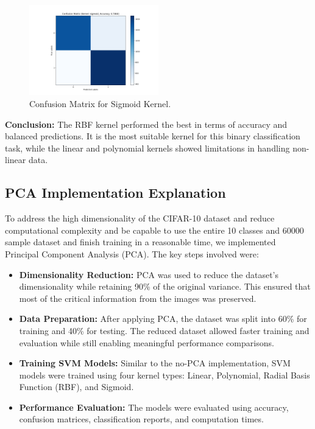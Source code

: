 \documentclass[lettersize,journal]{IEEEtran}
\begin{document}
\begin{figure}[H]
    \centering
    \includegraphics[width=0.5\textwidth]{confusion_matrix_2_classes_sigmoid.png}
    \caption{Confusion Matrix for Sigmoid Kernel.}
    \label{fig:confusion-matrix-sigmoid}
\end{figure}

\clearpage
\textbf{Conclusion:} The RBF kernel performed the best in terms of accuracy and balanced predictions. It is the most suitable kernel for this binary classification task, while the linear and polynomial kernels showed limitations in handling non-linear data.

\subsection{\textbf{PCA Implementation Explanation}}
To address the high dimensionality of the CIFAR-10 dataset and reduce computational complexity and be capable to use the entire 10 classes and 60000 sample dataset and finish training in a reasonable time, we implemented Principal Component Analysis (PCA). The key steps involved were:

\begin{itemize}
    \item \textbf{Dimensionality Reduction:} PCA was used to reduce the dataset's dimensionality while retaining 90\% of the original variance. This ensured that most of the critical information from the images was preserved.
    \item \textbf{Data Preparation:} After applying PCA, the dataset was split into 60\% for training and 40\% for testing. The reduced dataset allowed faster training and evaluation while still enabling meaningful performance comparisons.
    \item \textbf{Training SVM Models:} Similar to the no-PCA implementation, SVM models were trained using four kernel types: Linear, Polynomial, Radial Basis Function (RBF), and Sigmoid.
    \item \textbf{Performance Evaluation:} The models were evaluated using accuracy, confusion matrices, classification reports, and computation times.
\end{itemize}
\end{document}
